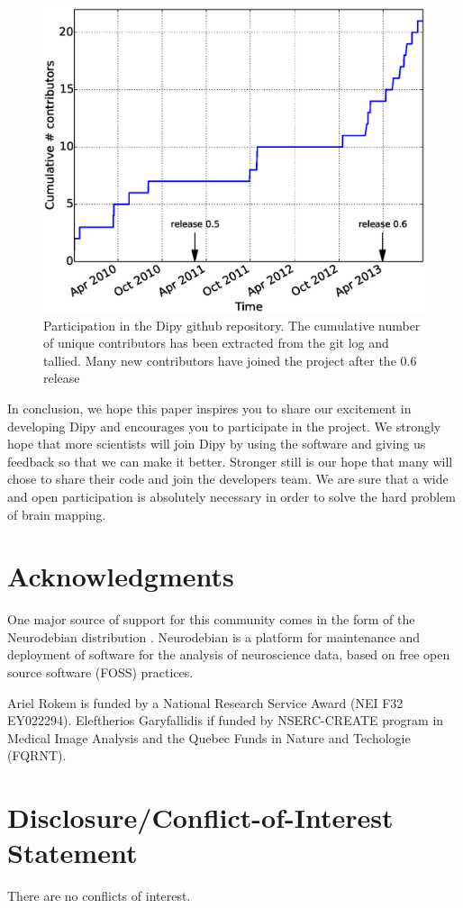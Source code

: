 \documentclass{bioinfo}
\begin{document}
\begin{figure}
\centering{}
\includegraphics[scale=0.37]{Figures/fig-gh.eps}
\caption{Participation in the Dipy github repository. The cumulative number of
  unique contributors has been extracted from the git log and tallied. Many
  new contributors have joined the project after the 0.6 release\label{Fig:gh_stats}}
\end{figure}

In conclusion, we hope this paper inspires you to share our excitement in developing Dipy and encourages
you to participate in the project. We strongly hope that more scientists will join
Dipy by using the software and giving us feedback so that we can make it better. Stronger still
is our hope that many will chose to share their code and join the developers team. We are sure that
a wide and open participation is absolutely necessary in order to solve the hard problem of brain mapping.


\section*{Acknowledgments}
One major source of support for this community comes in the form of the Neurodebian
distribution \citep{Halchenko2012}. Neurodebian is a platform for maintenance
and deployment of software for the analysis of neuroscience data, based on free
open source software (FOSS) practices.

Ariel Rokem is funded by a National Research Service Award (NEI F32 EY022294).
Eleftherios Garyfallidis if funded by NSERC-CREATE program in Medical
Image Analysis and the Quebec Funds in Nature and Techologie (FQRNT).

\section*{Disclosure/Conflict-of-Interest Statement}
There are no conflicts of interest.



%

%
%
%
%

\end{document}
